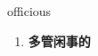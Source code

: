 
\begin{frame}
{\huge officious}
\begin{center}
\begin{enumerate}\Large
  \item \textbf{多管闲事的}
\end{enumerate}
\end{center}
\end{frame}
